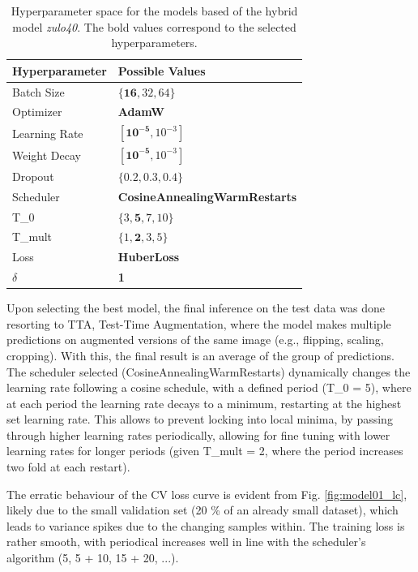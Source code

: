 \documentclass[conference]{IEEEtran}
\begin{document}
\begin{table}[H]
\centering
\caption{Hyperparameter space for the models based of the hybrid model \textit{zulo40}. The bold values correspond to the selected hyperparameters.}
\label{parametroszulp}
\begin{tabular}{ll}
\toprule
\textbf{Hyperparameter} & \textbf{Possible Values} \\
\midrule
Batch Size & $\{\mathbf{16}, 32, 64\}$ \\
Optimizer & \textbf{AdamW} \\
Learning Rate & $[\mathbf{10^{-5}}, 10^{-3}]$ \\
Weight Decay & $[\mathbf{10^{-5}}, 10^{-3}]$ \\
Dropout & $\{0.2, 0.3, \mathbf{0.4}\}$ \\
Scheduler & \textbf{CosineAnnealingWarmRestarts} \\
T\_0 & $\{3, \mathbf{5}, 7, 10\}$ \\
T\_mult & $\{1, \mathbf{2}, 3, 5\}$ \\
Loss & \textbf{HuberLoss} \\
$\delta$ & \textbf{1} \\
\bottomrule
\end{tabular}
\end{table}

Upon selecting the best model, the final inference on the test data was done resorting to TTA, Test-Time Augmentation, where the model makes multiple predictions on augmented versions of the same image (e.g., flipping, scaling, cropping). With this, the final result is an average of the group of predictions. The scheduler selected (CosineAnnealingWarmRestarts) dynamically changes the learning rate following a cosine schedule, with a defined period (T\_0 = 5), where at each period the learning rate decays to a minimum, restarting at the highest set learning rate. This allows to prevent locking into local minima, by passing through higher learning rates periodically, allowing for fine tuning with lower learning rates for longer periods (given T\_mult = 2, where the period increases two fold at each restart).

The erratic behaviour of the CV loss curve is evident from Fig. \ref{fig:model01_lc}, likely due to the small validation set (20 \% of an already small dataset), which leads to variance spikes due to the changing samples within. The training loss is rather smooth, with periodical increases well in line with the scheduler's algorithm (5, 5 + 10, 15 + 20, ...).
\end{document}
